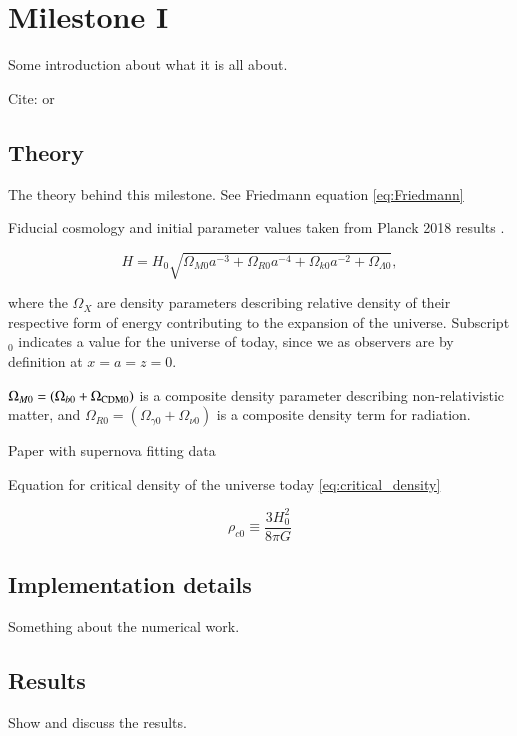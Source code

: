 \section{Milestone I}\label{sec:milestone_1}
Some introduction about what it is all about.

Cite: \citet{baumannLectureNotesCosmology2017} or \citet{dodelsonModernCosmology2021} \citep{callinHowCalculateCMB2006, wintherCosmologyIILecture2024, huCompleteTreatmentCMB1998}

\subsection{Theory}
The theory behind this milestone. See Friedmann equation \ref{eq:Friedmann}

Fiducial cosmology and initial parameter values taken from Planck 2018 results \citep{collaborationPlanck2018Results2020}.

\begin{equation}\label{eq:Friedmann}
    \boxed{H = H_0 \sqrt{ \Omega_{M 0} a^{-3} + \Omega_{R 0} a^{-4} + \Omega_{k 0} a^{-2} + \Omega_{\Lambda 0}}},
\end{equation}

where the $\Omega_{X}$ are density parameters describing relative density of their respective form of energy contributing to the expansion of the universe. Subscript $_0$ indicates a value for the universe of today, since we as observers are by definition at $x=a=z=0$.

$\Omega_{M 0} = (\Omega_{b0}+\Omega_{\rm CDM 0})$ is a composite density parameter describing non-relativistic matter, and $\Omega_{R 0} = (\Omega_{\gamma 0} + \Omega_{\nu 0})$ is a composite density term for radiation.

Paper with supernova fitting data \citet{betouleImprovedCosmologicalConstraints2014}

Equation for critical density of the universe today \ref{eq:critical_density}

\begin{equation}\label{eq:critical_density}
\rho_{c0} \equiv \frac{3H_0^2}{8\pi G}
\end{equation}

\subsection{Implementation details}
Something about the numerical work.

\subsection{Results}
Show and discuss the results.

